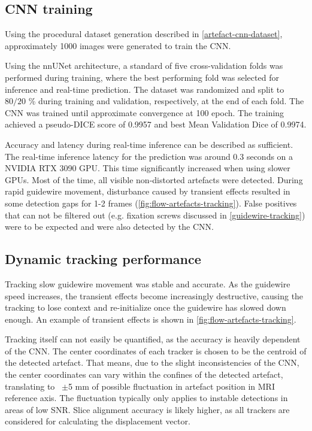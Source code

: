 \documentclass[conference]{IEEEtran}
\begin{document}
\subsection{CNN training}

Using the procedural dataset generation described in \ref{artefact-cnn-dataset}, approximately 1000 images were generated to train the CNN.

Using the nnUNet architecture, a standard of five cross-validation folds was performed during training, where the best performing fold was selected for inference and real-time prediction. The dataset was randomized and split to $80/20$ \% during training and validation, respectively, at the end of each fold. The CNN was trained until approximate convergence at 100 epoch. The training achieved a pseudo-DICE score of 0.9957 and best Mean Validation Dice of 0.9974.

Accuracy and latency during real-time inference can be described as sufficient. The real-time inference latency for the prediction was around 0.3 seconds on a NVIDIA RTX 3090 GPU. This time significantly increased when using slower GPUs. Most of the time, all visible non-distorted artefacts were detected. During rapid guidewire movement, disturbance caused by transient effects resulted in some detection gaps for 1-2 frames (\autoref{fig:flow-artefacts-tracking}). False positives that can not be filtered out (e.g. fixation screws discussed in \ref{guidewire-tracking}) were to be expected and were also detected by the CNN.

\subsection{Dynamic tracking performance}

Tracking slow guidewire movement was stable and accurate. As the guidewire speed increases, the transient effects become increasingly destructive, causing the tracking to lose context and re-initialize once the guidewire has slowed down enough. An example of transient effects is shown in \autoref{fig:flow-artefacts-tracking}.

Tracking itself can not easily be quantified, as the accuracy is heavily dependent of the CNN. The center coordinates of each tracker is chosen to be the centroid of the detected artefact. That means, due to the slight inconsistencies of the CNN, the center coordinates can vary within the confines of the detected artefact, translating to ~$\pm$5 mm of possible fluctuation in artefact position in MRI reference axis. The fluctuation typically only applies to instable detections in areas of low SNR. Slice alignment accuracy is likely higher, as all trackers are considered for calculating the displacement vector.
\end{document}
